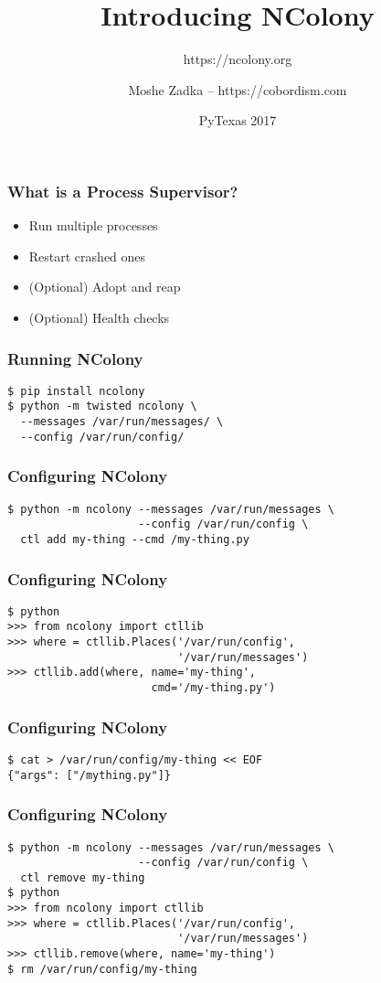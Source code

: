 \documentclass{beamer}
\title{Introducing NColony}
\subtitle{https://ncolony.org}
\author{Moshe Zadka -- https://cobordism.com}
\date{PyTexas 2017}
\begin{document}
 
\frame{\titlepage}

\begin{frame}
\frametitle{What is a Process Supervisor?}
\begin{itemize}
\item Run multiple processes \pause
\item Restart crashed ones \pause
\item (Optional) Adopt and reap \pause
\item (Optional) Health checks
\end{itemize}
\end{frame}

\begin{frame}[fragile]
\frametitle{Running NColony}
\begin{lstlisting}
$ pip install ncolony
$ python -m twisted ncolony \
  --messages /var/run/messages/ \
  --config /var/run/config/
\end{lstlisting}
\end{frame}

\begin{frame}[fragile]
\frametitle{Configuring NColony}
\begin{lstlisting}
$ python -m ncolony --messages /var/run/messages \
                    --config /var/run/config \
  ctl add my-thing --cmd /my-thing.py
\end{lstlisting}
\end{frame}

\begin{frame}[fragile]
\frametitle{Configuring NColony}
\begin{lstlisting}
$ python
>>> from ncolony import ctllib
>>> where = ctllib.Places('/var/run/config',
                          '/var/run/messages')
>>> ctllib.add(where, name='my-thing',
                      cmd='/my-thing.py')
\end{lstlisting}
\end{frame}

\begin{frame}[fragile]
\frametitle{Configuring NColony}
\begin{lstlisting}
$ cat > /var/run/config/my-thing << EOF
{"args": ["/mything.py"]}
\end{lstlisting}
\end{frame}

\begin{frame}[fragile]
\frametitle{Configuring NColony}
\begin{lstlisting}
$ python -m ncolony --messages /var/run/messages \
                    --config /var/run/config \
  ctl remove my-thing
$ python
>>> from ncolony import ctllib
>>> where = ctllib.Places('/var/run/config',
                          '/var/run/messages')
>>> ctllib.remove(where, name='my-thing')
$ rm /var/run/config/my-thing
\end{lstlisting}
\end{frame}
\end{document}
